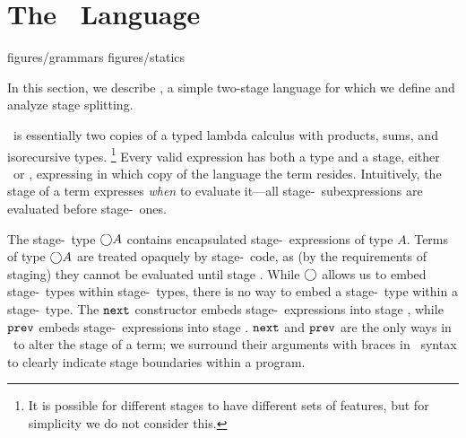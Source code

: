 \section{The \lang\ Language}
\label{sec:semantics}

 {figures/grammars}
 {figures/statics}

In this section, we describe \lang, a simple two-stage language
for which we define and analyze stage splitting.


\lang\ is essentially two copies of a typed lambda calculus with
products, sums, and isorecursive types.%
\footnote{It is possible for different stages to have different sets of
features, but for simplicity we do not consider this.}
Every valid expression has both a type and a stage, either \bbone~or \bbtwo,
expressing in which copy of the language the term resides. Intuitively, the
stage of a term expresses \emph{when} to evaluate it---all stage-\bbone\
subexpressions are evaluated before stage-\bbtwo\ ones.

The stage-\bbone\ type $\bigcirc A$ contains encapsulated
stage-\bbtwo\ expressions of type $A$. Terms of type $\bigcirc A$ are treated
opaquely by stage-\bbone\ code, as (by the requirements of staging) they cannot be evaluated until stage \bbtwo.
While $\bigcirc$ allows us to embed stage-\bbtwo\ types within stage-\bbone\ types,
there is no way to embed a stage-\bbone\ type within a stage-\bbtwo\ type.
The ${\tt next}$ constructor embeds stage-\bbtwo\ expressions into stage \bbone,
while ${\tt prev}$ embeds stage-\bbone\ expressions into stage \bbtwo.  ${\tt next}$ and ${\tt prev}$ are the
only ways in \lang\ to alter the stage of a term; we surround their arguments
with braces in \lang\ syntax to clearly indicate stage boundaries within a
program.

